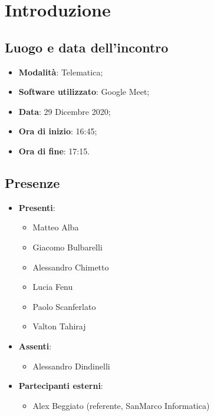 \documentclass[]{article}
\begin{document}
	
	
	
	\newpage
	
	
	\section{Introduzione}
		\subsection{Luogo e data dell'incontro}
		\begin{itemize}
			\item \textbf{Modalità}: Telematica;
			\item \textbf{Software utilizzato}: Google Meet;
			\item \textbf{Data}: 29 Dicembre 2020;
			\item \textbf{Ora di inizio}: 16:45;
			\item \textbf{Ora di fine}: 17:15.
		\end{itemize}
		
		\subsection{Presenze}
		\begin{itemize}
			\item \textbf{Presenti}: 
			\begin{itemize}
				\item Matteo Alba
				\item Giacomo Bulbarelli
				\item Alessandro Chimetto
				\item Lucia Fenu
				\item Paolo Scanferlato
				\item Valton Tahiraj
			\end{itemize}
			\item \textbf{Assenti}:
			\begin{itemize}
				\item Alessandro Dindinelli
			\end{itemize}
			\item \textbf{Partecipanti esterni}:
			\begin{itemize}
				\item Alex Beggiato (referente, SanMarco Informatica)
			\end{itemize}	
		\end{itemize}
		
\end{document}

